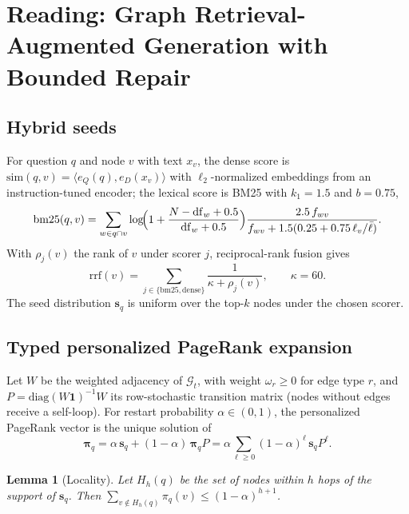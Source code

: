 \documentclass[10pt]{article}
\theoremstyle{plain}
\newtheorem{lemma}{Lemma}
\theoremstyle{definition}
\theoremstyle{remark}
\newcommand{\G}{\mathcal{G}}
\begin{document}
\section{Reading: Graph Retrieval-Augmented Generation with Bounded Repair}
\label{sec:read}

\subsection{Hybrid seeds}

For question $q$ and node $v$ with text $x_v$, the dense score is
$\mathrm{sim}(q,v)=\langle e_Q(q),e_D(x_v)\rangle$ with $\ell_2$-normalized
embeddings from an instruction-tuned encoder; the lexical score is BM25 with
$k_1=1.5$ and $b=0.75$,
\begin{equation}
\mathrm{bm25}(q,v)=\sum_{w\in q\cap v}\log\!\Bigl(1+\frac{N-\mathrm{df}_w+0.5}{\mathrm{df}_w+0.5}\Bigr)\frac{2.5\,f_{wv}}{f_{wv}+1.5(0.25+0.75\,\ell_v/\bar\ell)}.
\label{eq:bm25}
\end{equation}
With $\rho_j(v)$ the rank of $v$ under scorer $j$, reciprocal-rank fusion
\citep{cormack2009rrf} gives
\begin{equation}
\mathrm{rrf}(v)=\sum_{j\in\{\mathrm{bm25},\mathrm{dense}\}}\frac{1}{\kappa+\rho_j(v)},\qquad \kappa=60.
\label{eq:rrf}
\end{equation}
The seed distribution $\mathbf{s}_q$ is uniform over the top-$k$ nodes under
the chosen scorer.

\subsection{Typed personalized PageRank expansion}
\label{sec:ppr}

Let $W$ be the weighted adjacency of $\G_t$, with weight $\omega_r\ge0$ for edge
type $r$, and $P=\mathrm{diag}(W\mathbf{1})^{-1}W$ its row-stochastic transition
matrix (nodes without edges receive a self-loop). For restart probability
$\alpha\in(0,1)$, the personalized PageRank vector is the unique solution of
\begin{equation}
\boldsymbol{\pi}_q=\alpha\,\mathbf{s}_q+(1-\alpha)\,\boldsymbol{\pi}_q P
=\alpha\sum_{\ell\ge0}(1-\alpha)^{\ell}\,\mathbf{s}_q P^{\ell}.
\label{eq:ppr}
\end{equation}

\begin{lemma}[Locality]
\label{lem:ppr}
Let $H_h(q)$ be the set of nodes within $h$ hops of the support of $\mathbf{s}_q$.
Then $\sum_{v\notin H_h(q)}\pi_q(v)\le(1-\alpha)^{h+1}$.
\end{lemma}
\end{document}
